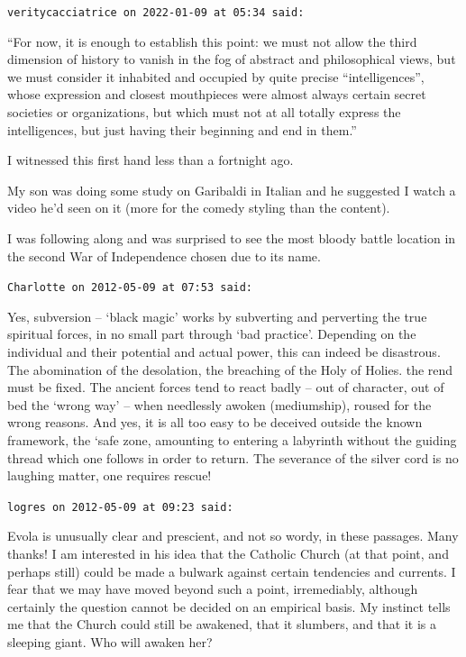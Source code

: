 \begin{footnotesize}
\begin{sffamily}
\hfill

\texttt{veritycacciatrice on 2022-01-09 at 05:34 said:}

``For now, it is enough to establish this point: we must not allow the third dimension of history to vanish in the fog of abstract and philosophical views, but we must consider it inhabited and occupied by quite precise ``intelligences'', whose expression and closest mouthpieces were almost always certain secret societies or organizations, but which must not at all totally express the intelligences, but just having their beginning and end in them.''

I witnessed this first hand less than a fortnight ago.

My son was doing some study on Garibaldi in Italian and he suggested I watch a video he'd seen on it (more for the comedy styling than the content).

I was following along and was surprised to see the most bloody battle location in the second War of Independence chosen due to its name.

\hfill

\texttt{Charlotte on 2012-05-09 at 07:53 said:}

Yes, subversion -- `black magic' works by subverting and perverting the true spiritual forces, in no small part through `bad practice'. Depending on the individual and their potential and actual power, this can indeed be disastrous. The abomination of the desolation, the breaching of the Holy of Holies. the rend must be fixed. The ancient forces tend to react badly -- out of character, out of bed the `wrong way' -- when needlessly awoken (mediumship), roused for the wrong reasons. And yes, it is all too easy to be deceived outside the known framework, the `safe zone, amounting to entering a labyrinth without the guiding thread which one follows in order to return. The severance of the silver cord is no laughing matter, one requires rescue!

\hfill

\texttt{logres on 2012-05-09 at 09:23 said:}

Evola is unusually clear and prescient, and not so wordy, in these passages. Many thanks! I am interested in his idea that the Catholic Church (at that point, and perhaps still) could be made a bulwark against certain tendencies and currents. I fear that we may have moved beyond such a point, irremediably, although certainly the question cannot be decided on an empirical basis. My instinct tells me that the Church could still be awakened, that it slumbers, and that it is a sleeping giant. Who will awaken her?


\end{sffamily}
\end{footnotesize}
